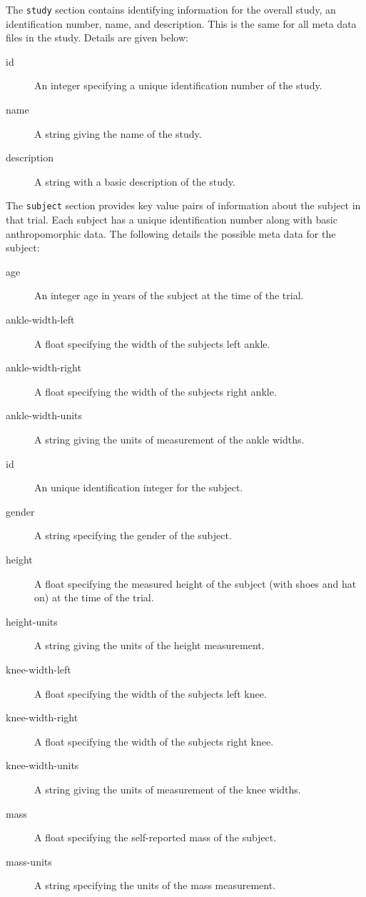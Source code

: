 \documentclass[fleqn,12pt]{wlpeerj}
\begin{document}
The \verb+study+ section contains identifying information for the overall
study, an identification number, name, and description. This is the same for
all meta data files in the study. Details are given below:
%
\begin{description}
  \item[id] An integer specifying a unique identification number of the study.
  \item[name] A string giving the name of the study.
  \item[description] A string with a basic description of the study.
\end{description}

The \verb+subject+ section provides key value pairs of information about the
subject in that trial. Each subject has a unique identification number along
with basic anthropomorphic data. The following details the possible meta data
for the subject:
%
\begin{description}
  \item[age] An integer age in years of the subject at the time of the trial.
  \item[ankle-width-left] A float specifying the width of the subjects left
    ankle.
  \item[ankle-width-right] A float specifying the width of the subjects right
    ankle.
  \item[ankle-width-units] A string giving the units of measurement of the
    ankle widths.
  \item[id] An unique identification integer for the subject.
  \item[gender] A string specifying the gender of the subject.
  \item[height] A float specifying the measured height of the subject (with
    shoes and hat on) at the time of the trial.
  \item[height-units] A string giving the units of the height measurement.
  \item[knee-width-left] A float specifying the width of the subjects left
    knee.
  \item[knee-width-right] A float specifying the width of the subjects right
    knee.
  \item[knee-width-units] A string giving the units of measurement of the
    knee widths.
  \item[mass] A float specifying the self-reported mass of the subject.
  \item[mass-units] A string specifying the units of the mass measurement.
\end{description}
\end{document}
